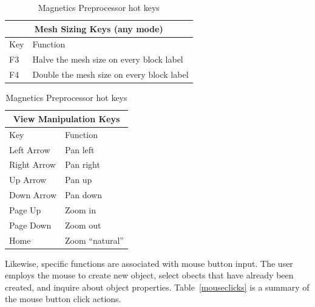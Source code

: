 \documentclass[12pt]{report}
\begin{document}
\begin{table}
\vspace*{12pt}
\begin{tabular}{|l|l|} \hline \hline
\multicolumn{2}{|c|}{Mesh Sizing Keys (any mode)} \\ \hline \hline
 Key    & Function \\ \hline \hline
 F3     & Halve the mesh size on every block label \\ \hline
 F4     & Double the mesh size on every block label \\ \hline \hline
\end{tabular}

\vspace*{12pt}
\begin{tabular}{|l|l|} \hline \hline
\multicolumn{2}{|c|}{View Manipulation Keys} \\ \hline \hline
 Key    & Function \\ \hline \hline
 Left Arrow  & Pan left \\ \hline
 Right Arrow  & Pan right \\ \hline
 Up Arrow  & Pan up \\ \hline
 Down Arrow  & Pan down \\ \hline
 Page Up & Zoom in  \\ \hline
 Page Down & Zoom out \\ \hline
 Home & Zoom ``natural'' \\ \hline \hline
\end{tabular}
\caption{Magnetics Preprocessor hot keys}
\label{hotkeys}
\end{table}

Likewise, specific functions are associated with mouse button
input.  The user employs the mouse to create new object, select
obects that have already been created, and inquire about object
properties.  Table~\ref{mouseclicks} is a summary of the mouse
button click actions.
\end{document}
